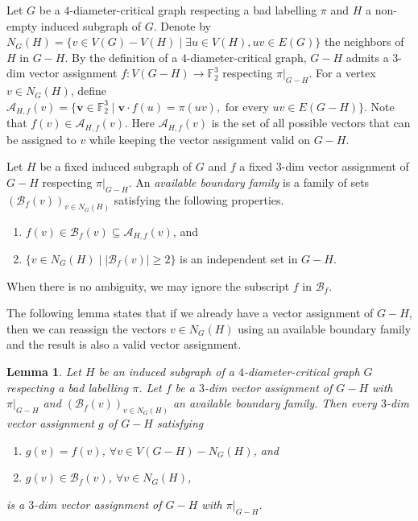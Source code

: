 \documentclass[
final
]{dmtcs-episciences}
\newtheorem{lemma}[theorem]{Lemma}
\begin{document}
Let $G$ be a $4$-diameter-critical graph respecting a bad labelling $\pi$ and
$H$ a non-empty induced subgraph of $G$. 
Denote by $N_G(H) = \{ v \in V(G)-V(H) \mid \exists u \in V(H), uv \in E(G) \}$ the neighbors of $H$ in $G-H$.
By the definition of a $4$-diameter-critical graph, $G-H$ admits a $3$-dim vector assignment $f: V(G-H) \rightarrow \mathbb{F}_2^3$ respecting $\pi|_{G-H}$.
For a vertex $v \in N_G(H)$, define $\mathcal{A}_{H,f}(v) = \{ \mathbf{v } \in \mathbb{F}_2^3 \mid \mathbf{v} \cdot f(u) = \pi(uv), \text{~for every~} uv \in E(G-H) \}$. Note that $f(v) \in \mathcal{A}_{H,f}(v)$.
Here $\mathcal{A}_{H,f}(v)$ is the set of all possible vectors that can be assigned to $v$ while keeping the vector assignment valid on $G-H$.

Let $H$ be a fixed induced subgraph of $G$ and $f$ a fixed $3$-dim vector assignment of $G-H$ respecting $\pi|_{G-H}$.
An \emph{available boundary family} is a family of sets ${(\mathcal{B}_f(v))}_{v \in N_G(H)}$ satisfying the following properties.
\begin{enumerate}
    \item $f(v) \in \mathcal{B}_f(v) \subseteq \mathcal{A}_{H,f}(v)$, and
    \item $\{ v \in N_G(H) \mid |\mathcal{B}_f(v)| \ge 2 \}$ is an independent set in $G-H$.
\end{enumerate}
When there is no ambiguity, we may ignore the subscript $f$ in $\mathcal{B}_f$.

The following lemma states that if we already have a vector assignment of $G-H$, then we can reassign the vectors $v \in N_G(H)$ using an available boundary family and the result is also a valid vector assignment.

\begin{lemma}\label{lemma: available boundary sets}
Let $H$ be an induced subgraph of a $4$-diameter-critical graph $G$ respecting a bad labelling $\pi$.
Let $f$ be a $3$-dim vector assignment of $G-H$ with $\pi|_{G-H}$ and ${(\mathcal{B}_f(v))}_{v \in N_G(H)}$ an available boundary family.
Then every $3$-dim vector assignment $g$ of $G-H$ satisfying
\begin{enumerate}
    \item $g(v) = f(v)$, $\forall v \in V(G-H) - N_G(H)$, and
    \item $g(v) \in \mathcal{B}_f(v) $, $\forall v \in N_G(H)$,
\end{enumerate}
is a $3$-dim vector assignment of $G-H$ with $\pi|_{G-H}$.
\end{lemma}
\end{document}
